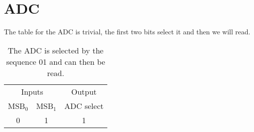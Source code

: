 \documentclass{article}
\begin{document}
\section{ADC}
The table for the ADC is trivial, the first two bits select it and then we will read. 
\begin{table}[hb]
\begin{tabular}{cc|c}
\multicolumn{2}{c}{Inputs} & Output\\
MSB$_0$& MSB$_{1}$& ADC select\\\midrule
0&1&1  \\
\end{tabular}
\caption{The ADC is selected by the sequence 01 and can then be read. }
\end{table}
\end{document}
